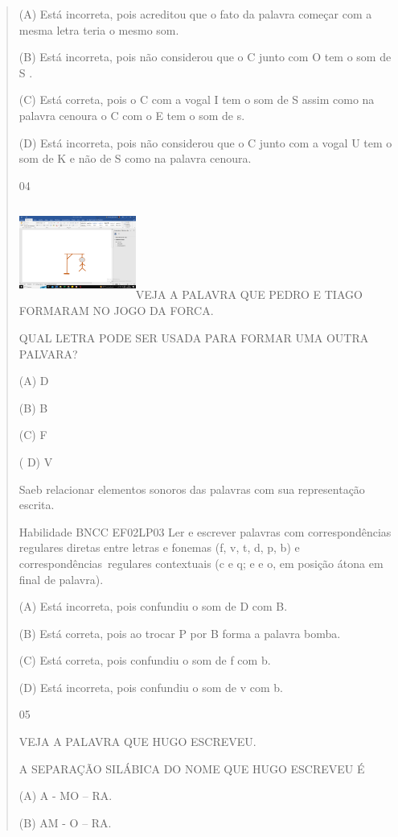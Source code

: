 {{{{\begin{verse}
{{\begin{escolha}
{{{{{\protect\hypertarget{_Hlk129366993}{}{}(A) Está incorreta, pois
acreditou que o fato da palavra começar com a mesma letra teria o mesmo
som.

(B) Está incorreta, pois não considerou que o C junto com O tem o som de
S .

(C) Está correta, pois o C com a vogal I tem o som de S assim como na
palavra cenoura o C com o E tem o som de s.

(D) Está incorreta, pois não considerou que o C junto com a vogal U tem
o som de K e não de S como na palavra cenoura.

\num{04}

\includegraphics[width=1.50909in,height=1.22355in]{media/image150.png}VEJA
A PALAVRA QUE PEDRO E TIAGO FORMARAM NO JOGO DA FORCA.

\protect\hypertarget{_Hlk129505254}{}{}QUAL LETRA PODE SER USADA PARA
FORMAR UMA OUTRA PALVARA?

(A) D

(B) B

(C) F

( D) V

Saeb relacionar elementos sonoros das palavras com sua representação
escrita.

Habilidade BNCC EF02LP03 Ler e escrever palavras com correspondências
regulares diretas entre letras e fonemas (f, v, t, d, p, b) e
correspondências~regulares contextuais (c e q; e e o, em posição átona
em final de palavra).

(A) Está incorreta, pois confundiu o som de D com B.

(B) Está correta, pois ao trocar P por B forma a palavra bomba.

(C) Está correta, pois confundiu o som de f com b.

(D) Está incorreta, pois confundiu o som de v com b.

\num{05}

VEJA A PALAVRA QUE HUGO ESCREVEU.

A SEPARAÇÃO SILÁBICA DO NOME QUE HUGO ESCREVEU É

(A) A - MO -- RA.

(B) AM - O -- RA.

}}}}}
\end{escolha}}}
\end{verse}}}}}
